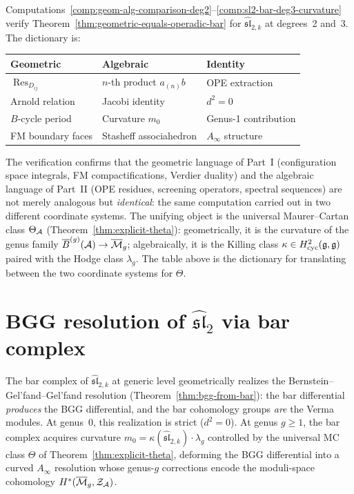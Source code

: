 \begin{remark}
\label{rem:comparison-summary}
Computations~\ref{comp:geom-alg-comparison-deg2}--\ref{comp:sl2-bar-deg3-curvature}
verify Theorem~\ref{thm:geometric-equals-operadic-bar} for
$\widehat{\mathfrak{sl}}_{2,k}$ at degrees~2 and~3.  The dictionary is:
\begin{center}
\renewcommand{\arraystretch}{1.3}
\begin{tabular}{lll}
\textbf{Geometric} & \textbf{Algebraic} & \textbf{Identity} \\
\hline
$\operatorname{Res}_{D_{ij}}$ &
  $n$-th product $a_{(n)}b$ & OPE extraction \\
Arnold relation & Jacobi identity & $d^2 = 0$ \\
$B$-cycle period & Curvature $m_0$ & Genus-1 contribution \\
FM boundary faces & Stasheff associahedron & $A_\infty$ structure \\
\end{tabular}
\end{center}
The verification confirms that the geometric language of
Part~I (configuration space integrals, FM
compactifications, Verdier duality) and the algebraic language
of Part~II (OPE residues, screening operators,
spectral sequences) are not merely analogous but
\emph{identical}: the same computation carried out in two
different coordinate systems.
The unifying object is the universal Maurer--Cartan class
$\Theta_{\mathcal{A}}$ (Theorem~\ref{thm:explicit-theta}):
geometrically, it is the curvature of the genus family
$\overline{B}^{(g)}(\mathcal{A}) \to \overline{\mathcal{M}}_g$;
algebraically, it is the Killing class
$\kappa \in H^2_{\mathrm{cyc}}(\mathfrak{g},\mathfrak{g})$ paired with
the Hodge class $\lambda_g$.  The table above is the
dictionary for translating between the two coordinate
systems for $\Theta$.
\end{remark}

\section{\texorpdfstring{BGG resolution of $\widehat{\mathfrak{sl}}_2$ via bar
complex}{BGG resolution of sl-2 via bar complex}}
\label{sec:bgg-sl2-bar}

The bar complex of $\widehat{\mathfrak{sl}}_{2,k}$
at generic level geometrically realizes the Bernstein--Gel'fand--Gel'fand
resolution (Theorem~\ref{thm:bgg-from-bar}): the bar differential
\emph{produces} the BGG differential, and the bar cohomology groups
\emph{are} the Verma modules.
At genus~$0$, this realization is strict ($d^2 = 0$).
At genus $g \geq 1$, the bar complex acquires curvature
$m_0 = \kappa(\widehat{\mathfrak{sl}}_{2,k}) \cdot \lambda_g$
controlled by the universal MC class $\Theta$ of
Theorem~\ref{thm:explicit-theta}, deforming the BGG
differential into a curved $A_\infty$ resolution whose
genus-$g$ corrections encode the moduli-space cohomology
$H^*(\overline{\mathcal{M}}_g, \mathcal{Z}_{\mathcal{A}})$.

